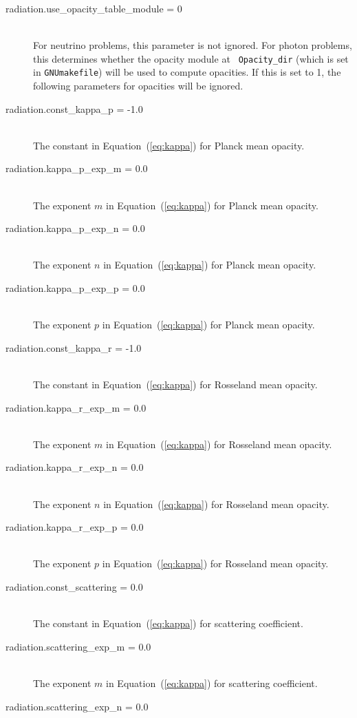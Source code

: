 \documentclass[11pt,letterpaper]{article}
\begin{document}
\begin{description}
\item[radiation.use\_opacity\_table\_module = 0] \hfill \\
  For neutrino problems, this parameter is not ignored.  For photon
  problems, this determines whether the opacity module at {\tt
    Opacity\_dir} (which is set in {\tt GNUmakefile}) will be used to
  compute opacities.  If this is set to 1, the following parameters
  for opacities will be ignored.  
\item[radiation.const\_kappa\_p = -1.0] \hfill \\
  The constant in Equation~(\ref{eq:kappa}) for Planck mean
  opacity. 
\item[radiation.kappa\_p\_exp\_m = 0.0] \hfill \\
  The exponent $m$ in Equation~(\ref{eq:kappa}) for Planck mean
  opacity. 
\item[radiation.kappa\_p\_exp\_n = 0.0] \hfill \\
  The exponent $n$ in Equation~(\ref{eq:kappa}) for Planck mean
  opacity. 
\item[radiation.kappa\_p\_exp\_p = 0.0] \hfill \\
  The exponent $p$ in Equation~(\ref{eq:kappa}) for Planck mean
  opacity. 
\item[radiation.const\_kappa\_r = -1.0] \hfill \\
  The constant in Equation~(\ref{eq:kappa}) for Rosseland mean
  opacity. 
\item[radiation.kappa\_r\_exp\_m = 0.0] \hfill \\
  The exponent $m$ in Equation~(\ref{eq:kappa}) for Rosseland mean
  opacity. 
\item[radiation.kappa\_r\_exp\_n = 0.0] \hfill \\
  The exponent $n$ in Equation~(\ref{eq:kappa}) for Rosseland mean
  opacity. 
\item[radiation.kappa\_r\_exp\_p = 0.0] \hfill \\
  The exponent $p$ in Equation~(\ref{eq:kappa}) for Rosseland mean
  opacity. 
\item[radiation.const\_scattering = 0.0] \hfill \\
  The constant in Equation~(\ref{eq:kappa}) for scattering coefficient.
\item[radiation.scattering\_exp\_m = 0.0] \hfill \\
  The exponent $m$ in Equation~(\ref{eq:kappa}) for scattering coefficient.
\item[radiation.scattering\_exp\_n = 0.0] \hfill \\

\end{description}
\end{document}
